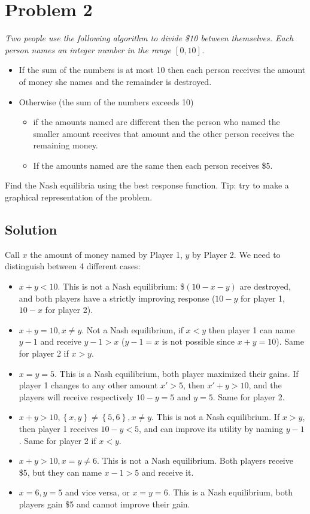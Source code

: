 \documentclass[a4paper, 12pt]{article}
\begin{document}
\section{Problem 2}
{\itshape
Two people use the following algorithm to divide \$10 between themselves. Each person names an integer number in the range \([0, 10]\).
\begin{itemize}
	\item If the sum of the numbers is at most 10 then each person receives the amount of money she names and the remainder is destroyed.
	\item Otherwise (the sum of the numbers exceeds 10)
	\begin{itemize}
		\item if the amounts named are different then the person who named the smaller amount receives that amount and the other person receives the remaining money.
		\item If the amounts named are the same then each person receives \$5.
	\end{itemize}
\end{itemize}



Find the Nash equilibria using the best response function. Tip: try to make a graphical representation of the problem.
}
\subsection{Solution}
Call $x$ the amount of money named by Player 1, $y$ by Player 2. We need to distinguish between 4
different cases:
\begin{itemize}
\item \(x+y < 10\). This is not a Nash equilibrium: \$\((10-x-y)\) are
  destroyed, and both players have a strictly improving response (\(10-y\) for
  player 1, \(10-x\) for player 2).

\item \(x+y =10, x \neq y\). Not a Nash equilibrium, if \(x < y\) then player 1 can
  name \(y - 1\) and receive \(y-1 > x\) (\(y-1 = x\) is not possible since
  \(x+y=10\)). Same for player 2 if \(x > y\).

\item \(x = y = 5\). This is a Nash equilibrium, both player maximized their
  gains. If player 1 changes to any other amount \(x' > 5\), then
  \(x' + y > 10\), and the players will receive respectively \(10-y=5\) and
  \(y=5\). Same for player 2.

\item \(x+y > 10, \left\{ x,y \right\} \neq \left\{ 5,6 \right\}, x \neq y\). This is
  not a Nash equilibrium. If \(x > y\), then player 1 receives \(10-y < 5\), and
  can improve its utility by naming \(y-1\). Same for player 2 if \(x < y\).

\item \(x+y > 10, x= y \neq 6\). This is not a Nash equilibrium. Both players
  receive \$5, but they can name \(x-1 > 5\) and receive it.

\item \(x=6, y=5\) and vice versa, or \(x=y=6\). This is a Nash equilibrium,
  both players gain \$5 and cannot improve their gain.
\end{itemize}
\end{document}
